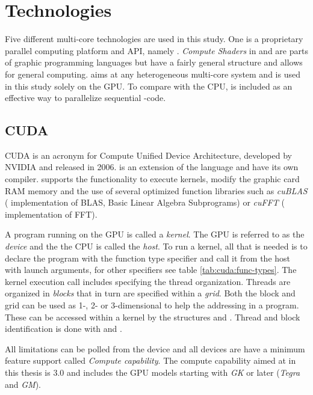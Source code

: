 \chapter{Technologies}

\newcommand{\procwidth}{{\textwidth * 3 / 4}}

Five different multi-core technologies are used in this study. One is a proprietary parallel computing platform and API, namely {\CU}. \textit{Compute Shaders} in {\GL} and {\DX} are parts of graphic programming languages but have a fairly general structure and allows for general computing. {\OCL} aims at any heterogeneous multi-core system and is used in this study solely on the GPU. To compare with the CPU, {\OMP} is included as an effective way to parallelize sequential {\CPP}-code.

\section{CUDA}

CUDA is an acronym for Compute Unified Device Architecture, developed by NVIDIA and released in 2006. {\CU} is an extension of the {\CPP} language and have its own compiler. {\CU} supports the functionality to execute kernels, modify the graphic card RAM memory and the use of several optimized function libraries such as \textit{cuBLAS} ({\CU} implementation of BLAS, Basic Linear Algebra Subprograms) or \textit{cuFFT} ({\CU} implementation of FFT).

A program running on the GPU is called a \emph{kernel}. The GPU is referred to as the \textit{device} and the the CPU is called the \textit{host}. To run a {\CU} kernel, all that is needed is to declare the program with the function type specifier  and call it from the host with launch arguments, for other specifiers see table \ref{tab:cuda:func-types}. The kernel execution call includes specifying the thread organization. Threads are organized in \emph{blocks} that in turn are specified within a \emph{grid}. Both the block and grid can be used as 1-, 2- or 3-dimensional to help the addressing in a program. These can be accessed within a kernel by the structures  and . Thread and block identification is done with  and .

All limitations can be polled from the device and all devices are have a minimum feature support called \emph{Compute capability}. The compute capability aimed at in this thesis is $3.0$ and includes the GPU models starting with \emph{GK} or later (\emph{Tegra} and \emph{GM}).

